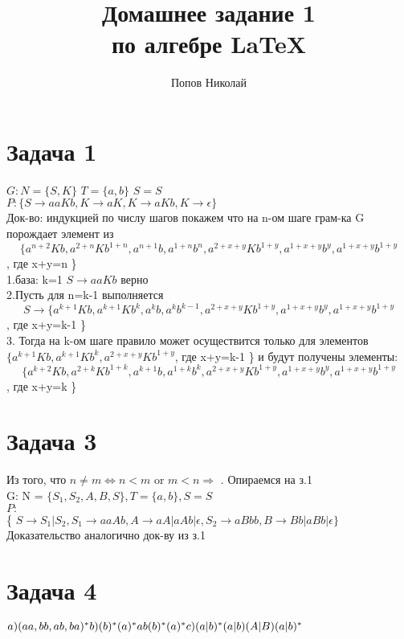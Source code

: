 \documentclass[a4paper,12pt]{article} %
\author{Попов Николай}
\title{Домашнее задание 1\\ по алгебре \LaTeX{}}
\begin{document}


\newpage 

\section*{Задача 1}
$G: N=\{S, K\} $ $T=\{a, b\}$  $S=S$  \\

$P:\{S\rightarrow aaKb, K\rightarrow aK, K\rightarrow aKb, K\rightarrow \epsilon \}$\\

Док-во: индукцией по числу шагов покажем что на n-ом шаге грам-ка G порождает элемент из \[ \{a^{n+2}Kb, a^{2+n}Kb^{1+n}, a^{n+1}b, a^{1+n}b^{n}, a^{2+x+y}Kb^{1+y}, a^{1+x+y}b^{y}, a^{1+x+y}b^{1+y}\], где x+y=n \} 
\\
1.база: k=1 
$S\rightarrow aaKb$ верно\\
2.Пусть для n=k-1 выполняется 
\[ S\rightarrow   \{a^{k+1}Kb, a^{k+1}Kb^{k}, a^{k}b, a^{k}b^{k-1}, a^{2+x+y}Kb^{1+y}, a^{1+x+y}b^{y}, a^{1+x+y}b^{1+y}\], где x+y=k-1 \} \\
3. Тогда на k-ом шаге правило может осуществится только для элементов $\{a^{k+1}Kb, a^{k+1}Kb^{k}, a^{2+x+y}Kb^{1+y}$, где x+y=k-1 \} и будут получены элементы:\\
\[ \{a^{k+2}Kb, a^{2+k}Kb^{1+k}, a^{k+1}b, a^{1+k}b^{k}, a^{2+x+y}Kb^{1+y}, a^{1+x+y}b^{y}, a^{1+x+y}b^{1+y}\], где x+y=k \}
 
 
 \section*{Задача 3}
Из того, что $n\neq m \Leftrightarrow n < m $ or $ m < n \Rightarrow  $ . Опираемся на з.1\\
G: N = $\{S_1, S_2, A, B, S \}, T=\{a, b\}, S=S $\\ $P:$\\
\{
$ S\rightarrow S_1|S_2, S_1 \rightarrow aaAb, A\rightarrow aA|aAb|\epsilon, S_2 \rightarrow  aBbb, B\rightarrow Bb|aBb|\epsilon\}$\\

Доказательство аналогично док-ву из з.1\\
 
 \section*{Задача 4}
 $ a)(aa, bb, ab, ba)^* \\
 b) (b)^*(a)^*ab(b)^*(a)^* \\
 c) (a|b)^*(a|b)(A|B)(a|b)^*$ 
\end{document}

